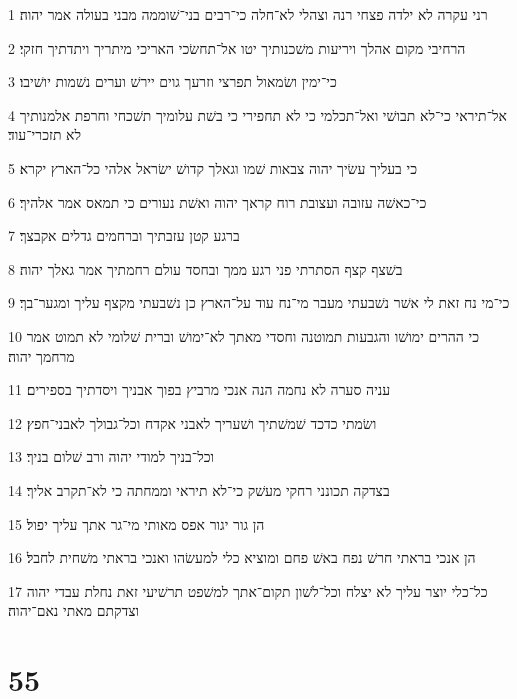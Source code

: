 \par 1 רני עקרה לא ילדה פצחי רנה וצהלי לא־חלה כי־רבים בני־שׁוממה מבני בעולה אמר יהוה׃
\par 2 הרחיבי מקום אהלך ויריעות משׁכנותיך יטו אל־תחשׂכי האריכי מיתריך ויתדתיך חזקי׃
\par 3 כי־ימין ושׂמאול תפרצי וזרעך גוים יירשׁ וערים נשׁמות יושׁיבו׃
\par 4 אל־תיראי כי־לא תבושׁי ואל־תכלמי כי לא תחפירי כי בשׁת עלומיך תשׁכחי וחרפת אלמנותיך לא תזכרי־עוד׃
\par 5 כי בעליך עשׂיך יהוה צבאות שׁמו וגאלך קדושׁ ישׂראל אלהי כל־הארץ יקרא׃
\par 6 כי־כאשׁה עזובה ועצובת רוח קראך יהוה ואשׁת נעורים כי תמאס אמר אלהיך׃
\par 7 ברגע קטן עזבתיך וברחמים גדלים אקבצך׃
\par 8 בשׁצף קצף הסתרתי פני רגע ממך ובחסד עולם רחמתיך אמר גאלך יהוה׃
\par 9 כי־מי נח זאת לי אשׁר נשׁבעתי מעבר מי־נח עוד על־הארץ כן נשׁבעתי מקצף עליך ומגער־בך׃
\par 10 כי ההרים ימושׁו והגבעות תמוטנה וחסדי מאתך לא־ימושׁ וברית שׁלומי לא תמוט אמר מרחמך יהוה׃
\par 11 עניה סערה לא נחמה הנה אנכי מרביץ בפוך אבניך ויסדתיך בספירים׃
\par 12 ושׂמתי כדכד שׁמשׁתיך ושׁעריך לאבני אקדח וכל־גבולך לאבני־חפץ׃
\par 13 וכל־בניך למודי יהוה ורב שׁלום בניך׃
\par 14 בצדקה תכונני רחקי מעשׁק כי־לא תיראי וממחתה כי לא־תקרב אליך׃
\par 15 הן גור יגור אפס מאותי מי־גר אתך עליך יפול׃
\par 16 הן אנכי בראתי חרשׁ נפח באשׁ פחם ומוציא כלי למעשׂהו ואנכי בראתי משׁחית לחבל׃
\par 17 כל־כלי יוצר עליך לא יצלח וכל־לשׁון תקום־אתך למשׁפט תרשׁיעי זאת נחלת עבדי יהוה וצדקתם מאתי נאם־יהוה׃

\chapter{55}

